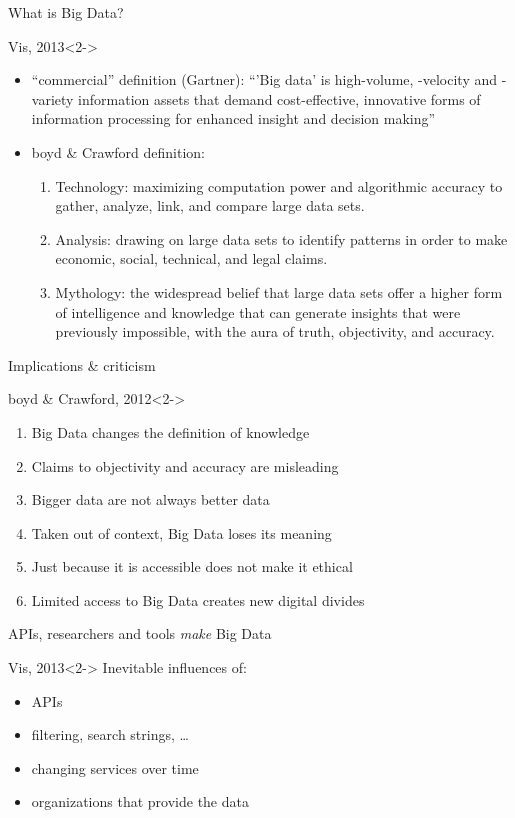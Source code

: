 \documentclass{beamer}
\begin{document}
\begin{frame}{What is Big Data?}
\begin{block}{Vis, 2013}<2->
\begin{itemize}
\item<2,4> ``commercial'' definition (Gartner): ``'Big data' is high-volume, -velocity and -variety information assets that demand cost-effective, innovative forms of information processing for enhanced insight and decision making''
\item<3-> boyd \& Crawford definition: 
\begin{enumerate}
\item Technology: maximizing computation power and algorithmic accuracy to gather, analyze, link, and compare large data sets.
\item Analysis: drawing on large data sets to identify patterns in order to make economic, social, technical, and legal claims.
\item Mythology: the widespread belief that large data sets offer a higher form of intelligence and knowledge that can generate insights that were previously impossible, with the aura of truth, objectivity, and accuracy.
\end{enumerate}
\end{itemize}
\end{block}
\end{frame}


\begin{frame}{Implications \& criticism}
\begin{block}{boyd \& Crawford, 2012}<2->
\begin{enumerate}
\item Big Data changes the definition of knowledge
\item Claims to objectivity and accuracy are misleading
\item Bigger data are not always better data
\item Taken out of context, Big Data loses its meaning
\item Just because it is accessible does not make it ethical
\item Limited access to Big Data creates new digital divides
\end{enumerate}
\end{block}
\end{frame}


\begin{frame}{APIs, researchers and tools \emph{make} Big Data}
\begin{block}{Vis, 2013}<2->
Inevitable influences of:
\begin{itemize}
\item APIs
\item filtering, search strings, \ldots
\item changing services over time
\item organizations that provide the data
\end{itemize}
\end{block}
\end{frame}
\end{document}
